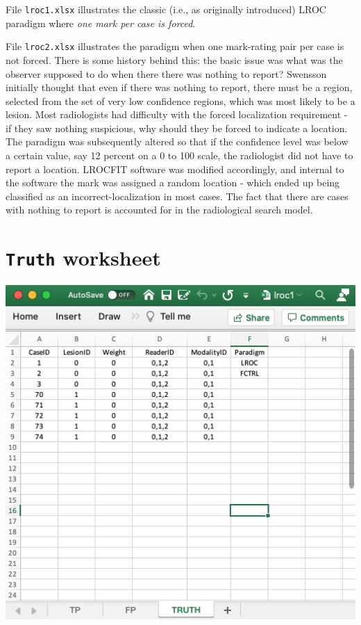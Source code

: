 \documentclass[
]{book}
\begin{document}
File \texttt{lroc1.xlsx} illustrates the classic (i.e., as originally introduced) LROC paradigm where \emph{one mark per case is forced}.

File \texttt{lroc2.xlsx} illustrates the paradigm when one mark-rating pair per case is not forced. There is some history behind this: the basic issue was what was the observer supposed to do when there there was nothing to report? Swensson initially thought that even if there was nothing to report, there must be a region, selected from the set of very low confidence regions, which was most likely to be a lesion. Most radiologists had difficulty with the forced localization requirement - if they saw nothing suspicious, why should they be forced to indicate a location. The paradigm was subsequently altered so that if the confidence level was below a certain value, say 12 percent on a 0 to 100 scale, the radiologist did not have to report a location. LROCFIT software was modified accordingly, and internal to the software the mark was assigned a random location - which ended up being classified as an incorrect-localization in most cases. The fact that there are cases with nothing to report is accounted for in the radiological search model.

\hypertarget{quick-start-lroc-truth}{%
\section{\texorpdfstring{\texttt{Truth} worksheet}{Truth worksheet}}\label{quick-start-lroc-truth}}

\includegraphics[width=1\textwidth,height=\textheight]{images/quick-start/lroc1Truth.png}
\end{document}
